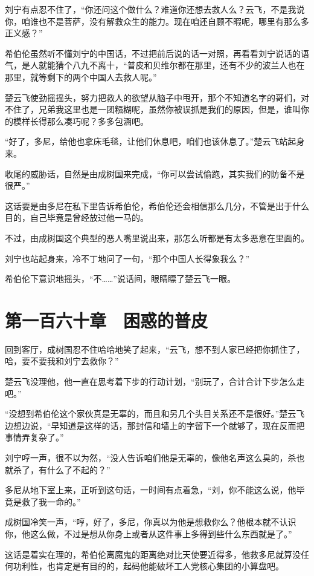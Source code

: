 刘宁有点忍不住了，“你还问这个做什么？难道你还想去救人么？云飞，不是我说你，咱谁也不是菩萨，没有解救众生的能力。现在咱还自顾不暇呢，哪里有那么多正义感？”

希伯伦虽然听不懂刘宁的中国话，不过把前后说的话一对照，再看看刘宁说话的语气，是人就能猜个八九不离十，“普皮和贝维尔都在那里，还有不少的波兰人也在那里，就等剩下的两个中国人去救人呢。”

楚云飞使劲摇摇头，努力把救人的欲望从脑子中甩开，那个不知道名字的哥们，对不住了，兄弟我这里也是一团糨糊呢，虽然你被误抓是我们的原因，但是，谁叫你的模样长得那么凑巧呢？多多包涵吧。

“好了，多尼，给他也拿床毛毯，让他们休息吧，咱们也该休息了。”楚云飞站起身来。

收尾的威胁话，自然是由成树国来完成，“你可以尝试偷跑，其实我们的防备不是很严。”

这话要是由多尼在私下里告诉希伯伦，希伯伦还会相信那么几分，不管是出于什么目的，自己毕竟是曾经放过他一马的。

不过，由成树国这个典型的恶人嘴里说出来，那怎么听都是有太多恶意在里面的。

刘宁也站起身来，冷不丁地问了一句，“那个中国人长得象我么？”

希伯伦下意识地摇头，“不……”说话间，眼睛瞟了楚云飞一眼。

\section{第一百六十章　困惑的普皮}

回到客厅，成树国忍不住哈哈地笑了起来，“云飞，想不到人家已经把你抓住了，哈，要不要我和刘宁去救你？”

楚云飞没理他，他一直在思考着下步的行动计划，“别玩了，合计合计下步怎么走吧。”

“没想到希伯伦这个家伙真是无辜的，而且和另几个头目关系还不是很好。”楚云飞边想边说，“早知道是这样的话，那封信和墙上的字留下一个就够了，现在反而把事情弄复杂了。”

刘宁哼一声，很不以为然，“没人告诉咱们他是无辜的，像他名声这么臭的，杀也就杀了，有什么了不起的？”

多尼从地下室上来，正听到这句话，一时间有点着急，“刘，你不能这么说，他毕竟是救了我一命的。”

成树国冷笑一声，“哼，好了，多尼，你真以为他是想救你么？他根本就不认识你，他这么做，不过是想从你身上或者从这件事上多得到些什么东西就是了。”

这话是着实在理的，希伯伦离魔鬼的距离绝对比天使要近得多，他救多尼就算没任何功利性，也肯定是有目的的，起码他能破坏工人党核心集团的小算盘吧。

